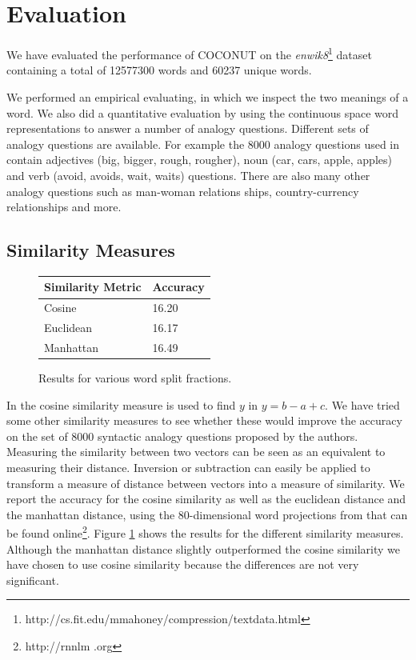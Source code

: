 \documentclass[11pt]{article}
\begin{document}
\section{Evaluation}
We have evaluated the performance of COCONUT on the \textit{enwik8}\footnote{http://cs.fit.edu/mmahoney/compression/textdata.html} dataset containing a total of 12577300 words and 60237 unique words. 

We performed an empirical evaluating, in which we inspect the two meanings of a word. We also did a quantitative evaluation by using the continuous space word representations to answer a number of analogy questions. Different sets of analogy questions are available. For example the 8000 analogy questions used in \cite{Mikolov:13} contain adjectives (big, bigger, rough, rougher), noun (car, cars, apple, apples) and verb (avoid, avoids, wait, waits) questions. There are also many other analogy questions such as man-woman relations ships, country-currency relationships and more.

\subsection{Similarity Measures}
\begin{figure}[H]
\center
    \begin{tabular}{l|l}
    \textbf{Similarity Metric} & \textbf{Accuracy}  \\ \hline
    Cosine            & 16.20     \\ \hline
    Euclidean         & 16.17     \\ \hline
    Manhattan         & 16.49     \\
    \end{tabular}
    \caption{Results for various word split fractions.}
    \label{metric1}
\end{figure}

In \cite{Mikolov:13} the cosine similarity measure is used to find $y$ in $y = b - a + c$. We have tried some other similarity measures to see whether these would improve the accuracy on the set of 8000 syntactic analogy questions proposed by the authors. Measuring the similarity between two vectors can be seen as an equivalent to measuring their distance. Inversion or subtraction can easily be applied to transform a measure of distance between vectors into a measure of similarity. We report the accuracy for the cosine similarity as well as the euclidean distance and the manhattan distance, using the 80-dimensional word projections from \cite{Mikolov:13} that can be found online\footnote{http://rnnlm .org}. Figure \ref{metric1} shows the results for the different similarity measures. Although the manhattan distance slightly outperformed the cosine similarity we have chosen to use cosine similarity because the differences are not very significant.
\end{document}
